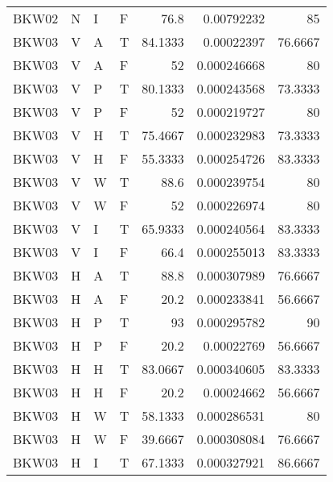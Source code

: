 \begin{longtable}{llllrrr}
    BKW02    & N         & I         & F          & 76.8       & 0.00792232  & 85       \\
    BKW03    & V         & A         & T          & 84.1333    & 0.00022397  & 76.6667  \\
    BKW03    & V         & A         & F          & 52         & 0.000246668 & 80       \\
    BKW03    & V         & P         & T          & 80.1333    & 0.000243568 & 73.3333  \\
    BKW03    & V         & P         & F          & 52         & 0.000219727 & 80       \\
    BKW03    & V         & H         & T          & 75.4667    & 0.000232983 & 73.3333  \\
    BKW03    & V         & H         & F          & 55.3333    & 0.000254726 & 83.3333  \\
    BKW03    & V         & W         & T          & 88.6       & 0.000239754 & 80       \\
    BKW03    & V         & W         & F          & 52         & 0.000226974 & 80       \\
    BKW03    & V         & I         & T          & 65.9333    & 0.000240564 & 83.3333  \\
    BKW03    & V         & I         & F          & 66.4       & 0.000255013 & 83.3333  \\
    BKW03    & H         & A         & T          & 88.8       & 0.000307989 & 76.6667  \\
    BKW03    & H         & A         & F          & 20.2       & 0.000233841 & 56.6667  \\
    BKW03    & H         & P         & T          & 93         & 0.000295782 & 90       \\
    BKW03    & H         & P         & F          & 20.2       & 0.00022769  & 56.6667  \\
    BKW03    & H         & H         & T          & 83.0667    & 0.000340605 & 83.3333  \\
    BKW03    & H         & H         & F          & 20.2       & 0.00024662  & 56.6667  \\
    BKW03    & H         & W         & T          & 58.1333    & 0.000286531 & 80       \\
    BKW03    & H         & W         & F          & 39.6667    & 0.000308084 & 76.6667  \\
    BKW03    & H         & I         & T          & 67.1333    & 0.000327921 & 86.6667  \\

\end{longtable}
